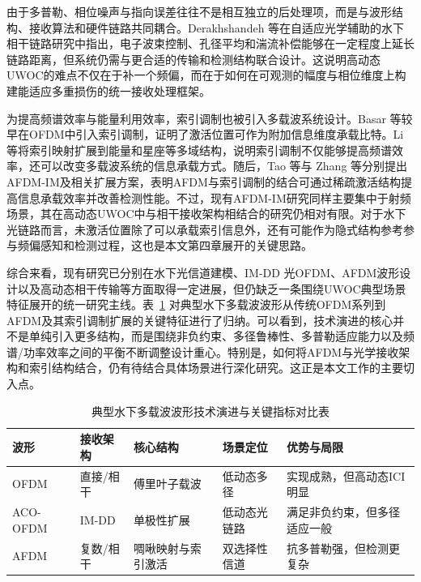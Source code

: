 由于多普勒、相位噪声与指向误差往往不是相互独立的后处理项，而是与波形结构、接收算法和硬件链路共同耦合。Derakhshandeh 等在自适应光学辅助的水下相干链路研究中指出，电子波束控制、孔径平均和湍流补偿能够在一定程度上延长链路距离，但系统仍需与更合适的传输和检测结构联合设计\cite{derakhshandehUnderwaterCoherentOptical2025}。这说明高动态UWOC的难点不仅在于补一个频偏，而在于如何在可观测的幅度与相位维度上构建能适应多重损伤的统一接收处理框架。

为提高频谱效率与能量利用效率，索引调制也被引入多载波系统设计。Basar 等较早在OFDM中引入索引调制，证明了激活位置可作为附加信息维度承载比特\cite{basarOrthogonalFrequencyDivision2013}。Li 等将索引映射扩展到能量和星座等多域结构，说明索引调制不仅能够提高频谱效率，还可以改变多载波系统的信息承载方式\cite{li2022composite}。随后，Tao 等与 Zhang 等分别提出AFDM-IM及相关扩展方案，表明AFDM与索引调制的结合可通过稀疏激活结构提高信息承载效率并改善检测性能\cite{taoAffineFrequencyDivision2025, zhangDualIndexModulation2026}。不过，现有AFDM-IM研究同样主要集中于射频场景，其在高动态UWOC中与相干接收架构相结合的研究仍相对有限。对于水下光链路而言，未激活位置除了可以承载索引信息外，还有可能作为隐式结构参考参与频偏感知和检测过程，这也是本文第四章展开的关键思路。

综合来看，现有研究已分别在水下光信道建模、IM-DD 光OFDM、AFDM波形设计以及高动态相干传输等方面取得一定进展，但仍缺乏一条围绕UWOC典型场景特征展开的统一研究主线。表~\ref{tab:waveform_evolution_comparison} 对典型水下多载波波形从传统OFDM系列到AFDM及其索引调制扩展的关键特征进行了归纳。可以看到，技术演进的核心并不是单纯引入更多结构，而是围绕非负约束、多径鲁棒性、多普勒适应能力以及频谱/功率效率之间的平衡不断调整设计重心。特别是，如何将AFDM与光学接收架构和索引结构结合，仍有待结合具体场景进行深化研究。这正是本文工作的主要切入点。

\begin{table}[htbp]
    \centering
    \caption{典型水下多载波波形技术演进与关键指标对比表}
    \label{tab:waveform_evolution_comparison}
    \footnotesize
    \setlength{\tabcolsep}{4pt}
    \begin{tabular}{p{1.9cm}p{1.8cm}p{2.3cm}p{1.9cm}p{3.0cm}}
        \toprule
        波形 & 接收架构 & 核心结构 & 场景定位 & 优势与局限 \\
        \midrule
     OFDM& 直接/相干 & 傅里叶子载波 & 低动态多径 & 实现成熟，但高动态ICI明显 \\
       ACO-OFDM&IM-DD& 单极性扩展 & 低动态光链路 & 满足非负约束，但多径适应一般 \\
       AFDM& 复数/相干 & 啁啾映射与索引激活 & 双选择性信道 & 抗多普勒强，但检测更复杂 \\
        \bottomrule
    \end{tabular}
\end{table}

